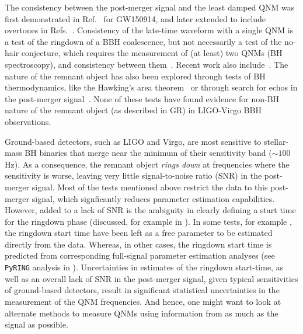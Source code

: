 The consistency between the post-merger signal and the least damped QNM was first demonstrated in
Ref.~\cite{TheLIGOScientific:2016src} for GW150914, and later extended to include
overtones in Refs.~\cite{Brito:2018rfr,Giesler:2019uxc,Isi:2019aib,Bhagwat:2019dtm,Forteza:2020hbw}. Consistency
of the late-time waveform with a single QNM is a test of the ringdown of
a BBH coalescence, but not necessarily a test of the no-hair
conjecture, which requires the measurement of (at least) two QNMs (BH
spectroscopy), and consistency between them~\cite{Dreyer:2003bv,Berti:2005ys}. Recent work
also include~\cite{Carullo:2018gah,Carullo:2019flw,Bhagwat:2019bwv}. The
nature of the remnant object has also been explored through tests of
BH thermodynamics, like the Hawking's area
theorem~\cite{Cabero:2017avf} or through search for echos in the
post-merger
signal~\cite{Nielsen:2018lkf,Tsang:2019zra,Lo:2018sep,Abedi:2018npz,Abedi:2020sgg,Testa:2018bzd}. None
of these tests have found evidence for non-BH nature of the remnant
object (as described in GR) in LIGO-Virgo BBH observations.

Ground-based detectors, such as LIGO and Virgo, are most sensitive to
stellar-mass BH binaries that merge near the
minimum of their sensitivity band ($\sim100$Hz). As a consequence, the
remnant object \textit{rings down} at frequencies where the sensitivity is worse, leaving
very little signal-to-noise ratio (SNR) in the
post-merger signal. Most of the tests mentioned above restrict the data to this post-merger signal, which signficantly reduces parameter estimation capabilities. However, added to a lack of SNR is the ambiguity in clearly defining a start time for the ringdown phase (discussed, for example in \cite{Bhagwat:2017tkm}). In some tests, for example \cite{Carullo:2018gah,Carullo:2019flw}, the ringdown start time have been left as a
free parameter to be estimated directly from the data. Whereas, in other cases, the ringdown start time is predicted from corresponding full-signal parameter estimation analyses (see \texttt{PyRING} analysis in \cite{Abbott:2020jks}). Uncertainties
in estimates of the ringdown start-time, as well as an overall lack of
SNR in the post-merger signal, given typical sensitivities of
ground-based detectors, result in significant statistical uncertainties
in the measurement of the QNM frequencies. And hence, one might want to look at alternate methods to measure QNMs using information from as much as the signal as possible.

